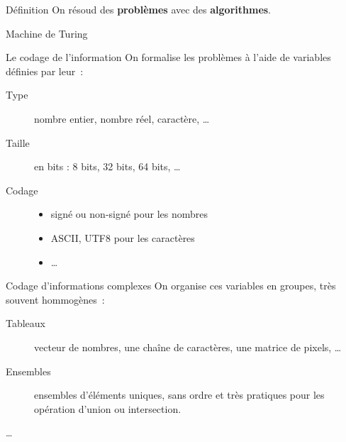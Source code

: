 \begin{frame}{Définition}
    On résoud des \textbf{problèmes} avec des \textbf{algorithmes}.
\end{frame}

\begin{frame}{Machine de Turing}
\end{frame}

\begin{frame}{Le codage de l'information}
  On formalise les problèmes à l'aide de variables définies par leur~:
  \begin{description}
    \item [Type] nombre entier, nombre réel, caractère, …
    \item [Taille] en bits : 8 bits, 32 bits, 64 bits, …
    \item [Codage] 
      \begin{itemize}
        \item signé ou non-signé pour les nombres
        \item ASCII, UTF8 pour les caractères
        \item …
      \end{itemize}
  \end{description}
\end{frame}

\begin{frame}{Codage d'informations complexes}
    On organise ces variables en groupes, très souvent hommogènes~:
    \begin{description}
        \item[Tableaux] vecteur de nombres, une chaîne de caractères, une matrice de pixels, …
        \item[Ensembles] ensembles d'éléments uniques, sans ordre et très pratiques pour les opération d'union ou intersection.
        \item[…]
    \end{description}
\end{frame}
